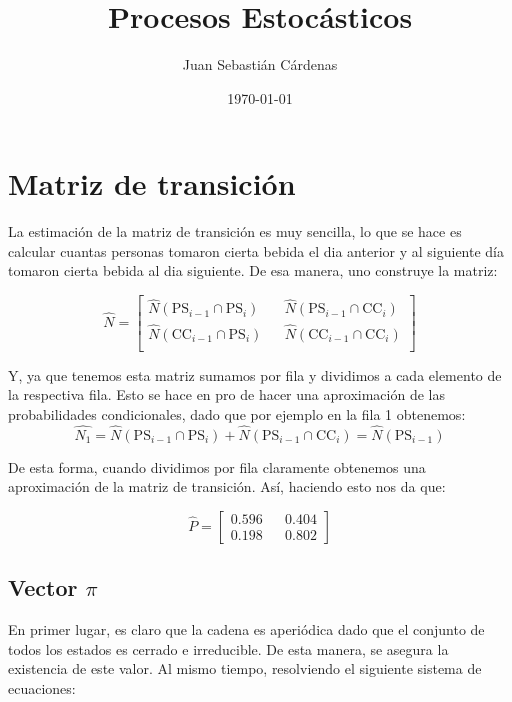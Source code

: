 \documentclass[11pt]{article}
\title{Procesos Estocásticos}
\author{Juan Sebastián Cárdenas}
\date{\today}
\theoremstyle{definition}
\theoremstyle{remark}
\theoremstyle{remark}
\begin{document}
\maketitle
\section{Matriz de transición}
La estimación de la matriz de transición es muy sencilla, lo que se
hace es calcular cuantas personas tomaron cierta bebida el dia
anterior y al siguiente día tomaron cierta bebida al dia siguiente. De
esa manera, uno construye la matriz:

\begin{equation}
  \label{eq:1}
  \hat{N} =
  \begin{bmatrix}
    \hat{N}(\text{PS}_{i-1} \cap \text{PS}_i) && \hat{N}(\text{PS}_{i-1} \cap \text{CC}_i) \\
    \hat{N}(\text{CC}_{i-1} \cap \text{PS}_i) && \hat{N}(\text{CC}_{i-1} \cap \text{CC}_i) \\
  \end{bmatrix}
\end{equation}

Y, ya que tenemos esta matriz sumamos por fila y dividimos a cada
elemento de la respectiva fila. Esto se hace en pro de hacer una
aproximación de las probabilidades condicionales, dado que por ejemplo
en la fila 1 obtenemos:
\begin{equation}
  \label{eq:2}
  \hat{N_1} = \hat{N}(\text{PS}_{i-1} \cap \text{PS}_i) + \hat{N}(\text{PS}_{i-1} \cap \text{CC}_i) = \hat{N}(\text{PS}_{i-1})
\end{equation}

De esta forma, cuando dividimos por fila claramente obtenemos una
aproximación de la matriz de transición. Así, haciendo esto nos da
que:

\begin{equation}
  \label{eq:3}
  \hat{P} =
  \begin{bmatrix}
    0.596 && 0.404 \\
    0.198 && 0.802
  \end{bmatrix}
\end{equation}

\subsection{Vector $\pi$}
En primer lugar, es claro que la cadena es aperiódica dado que el
conjunto de todos los estados es cerrado e irreducible. De esta
manera, se asegura la existencia de este valor. Al mismo tiempo,
resolviendo el siguiente sistema de ecuaciones:
\end{document}
